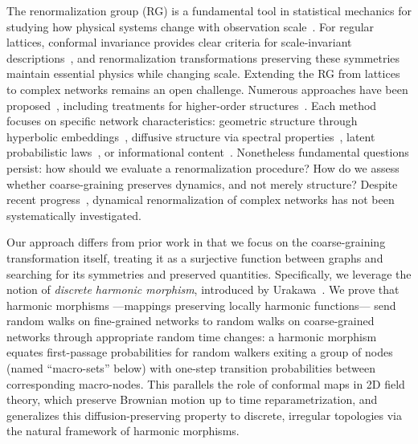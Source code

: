 \documentclass[twocolumn,superscriptaddress,tightenlines,aps,prx,floatfix]{revtex4-2}
\begin{document}
\begin{bibunit}
The renormalization group (RG) is a fundamental tool in statistical mechanics for studying how physical systems change with observation scale~\cite{Kadanoff_renorm,Wilson_renorm_critical_phenomena_Kondo}. For regular lattices, conformal invariance provides clear criteria for scale-invariant descriptions~\cite{Conformal_Invariance_Lattice_Models_Smirnov,Introduction_to_Conformal_Field_Theory}, and renormalization transformations preserving these symmetries maintain essential physics while changing scale.
Extending the RG from lattices to complex networks remains an open challenge. Numerous approaches have been proposed~\cite{Song_self_similarity_complex_nets_2005,Skeleton_and_Fractal_Scaling, Multiscale_unfolding_of_real_nets_geometric_renorm_2018, Garlaschelli_Multiscale_2023, Villegas_Laplacian_renorm_heterogeneous_2023, Coarse_graining_network_De_Domenico}, including treatments for higher-order structures~\cite{nurisso2025higher, Path_integral_higher_order_renorm, Battiston2021physics}. 
Each method focuses on specific network characteristics: geometric structure through hyperbolic embeddings~\cite{Multiscale_unfolding_of_real_nets_geometric_renorm_2018}, diffusive structure via spectral properties~\cite{Villegas_Laplacian_renorm_heterogeneous_2023}, latent probabilistic laws~\cite{Garlaschelli_Multiscale_2023}, or informational content~\cite{Coarse_graining_network_De_Domenico}. Nonetheless fundamental questions persist: how should we evaluate a renormalization procedure? How do we assess whether coarse-graining preserves dynamics, and not merely structure? Despite recent progress~\cite{chen2025preservingspreadingdynamicsinformation,yi2025equilibriumpreservinglaplacianrenormalizationgroup,Schmidt2025Spectral,KIM2025117398}, dynamical renormalization of complex networks has not been systematically investigated.

Our approach differs from prior work in that we focus on the coarse-graining transformation itself, treating it as a surjective function between graphs and searching for its symmetries and preserved quantities. Specifically, we leverage the notion of \emph{discrete harmonic morphism}, introduced by Urakawa~\cite{Urakawa_Harmonic_morphisms_2000}. We prove that harmonic morphisms ---mappings preserving locally harmonic functions--- send random walks on fine-grained networks to random walks on coarse-grained networks through appropriate random time changes: a harmonic morphism equates first-passage probabilities for random walkers exiting a group of nodes (named ``macro-sets'' below) with one-step transition probabilities between corresponding macro-nodes. 
This parallels the role of conformal maps in 2D field theory, which preserve Brownian motion up to time reparametrization, and generalizes this diffusion-preserving property to discrete, irregular topologies via the natural framework of harmonic morphisms.


\end{bibunit}
\end{document}
